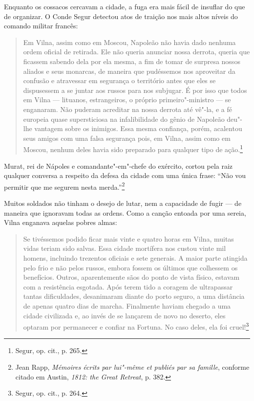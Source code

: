 Enquanto os cossacos cercavam a cidade, a fuga era mais fácil de
insuflar do que de organizar. O Conde Segur detectou atos de traição nos
mais altos níveis do comando militar francês:

\begin{quote}
Em Vilna, assim como em Moscou, Napoleão não havia dado nenhuma ordem
oficial de retirada. Ele não queria anunciar nossa derrota, queria que
ficassem sabendo dela por ela mesma, a fim de tomar de surpresa nossos
aliados e seus monarcas, de maneira que pudéssemos nos aproveitar da
confusão e atravessar em segurança o território antes que eles se
dispusessem a se juntar aos russos para nos subjugar. É por isso que
todos em Vilna --- lituanos, estrangeiros, o próprio primeiro"-ministro ---
se enganaram. Não puderam acreditar na nossa derrota até vê"-la, e a fé
europeia quase supersticiosa na infalibilidade do gênio de Napoleão
deu"-lhe vantagem sobre os inimigos. Essa mesma confiança, porém,
acalentou seus amigos com uma falsa segurança pois, em Vilna, assim como
em Moscou, nenhum deles havia sido preparado para qualquer tipo de
ação.\footnote{Segur, op. cit., p. 265.}
\end{quote}

Murat, rei de Nápoles e comandante"-em"-chefe do exército, cortou pela
raiz qualquer conversa a respeito da defesa da cidade com uma única
frase: ``Não vou permitir que me segurem nesta merda.''\footnote{Jean Rapp, \textit{Mémoires écrits par lui"-même et publiés par sa famille}, conforme citado em Austin, \textit{1812: the Great Retreat}, p. 382.}

Muitos soldados não tinham o desejo de lutar, nem a capacidade de fugir
--- de maneira que ignoravam todas as ordens. Como a canção entoada por
uma sereia, Vilna enganava aquelas pobres almas:

\begin{quote}
Se tivéssemos podido ficar mais vinte e quatro horas em Vilna, muitas
vidas teriam sido salvas. Essa cidade mortífera nos custou vinte mil
homens, incluindo trezentos oficiais e sete generais. A maior parte
atingida pelo frio e não pelos russos, embora fossem os últimos que
colhessem os benefícios. Outros, aparentemente sãos do ponto de vista
físico, estavam com a resistência esgotada. Após terem tido a coragem de
ultrapassar tantas dificuldades, desanimaram diante do porto seguro, a
uma distância de apenas quatro dias de marcha. Finalmente haviam chegado
a uma cidade civilizada e, ao invés de se lançarem de novo no deserto,
eles optaram por permanecer e confiar na Fortuna. No caso deles, ela foi
cruel!\footnote{Segur, op. cit., p. 264.}
\end{quote}

